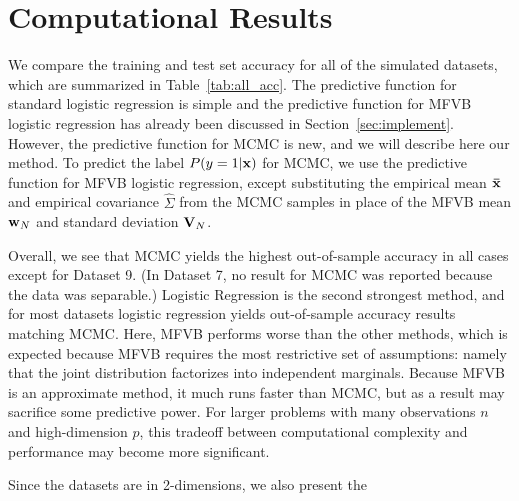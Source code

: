 
\section{Computational Results}\label{sec:comp}

We compare the training and test set accuracy for all of the simulated datasets, which are summarized in Table~\ref{tab:all_acc}.
The predictive function for standard logistic regression is simple and the predictive function for MFVB logistic regression has already been discussed in Section~\ref{sec:implement}.  However, the predictive function for MCMC is new, and we will describe here our method.  To predict the label $P(y=1|\boldsymbol{\mathbf{x}})$ for MCMC, we use the predictive function for MFVB logistic regression, except substituting the empirical mean $\boldsymbol{\mathbf{\bar x}}$ and empirical covariance ${\hat \Sigma}$ from the MCMC samples in place of the MFVB mean $\boldsymbol{\mathbf{w}}_N$ and standard deviation $\boldsymbol{\mathbf{V}}_N$.
 
Overall, we see that MCMC yields the highest out-of-sample accuracy in all cases except for Dataset 9.  (In Dataset 7, no result for
MCMC was reported because the data was separable.)  Logistic Regression is the second strongest method, and for most datasets logistic regression yields out-of-sample accuracy results matching MCMC.  Here, MFVB performs worse than the other methods, which is expected because MFVB requires the most restrictive set of assumptions: namely that the joint distribution factorizes into independent marginals.  Because MFVB is an approximate method, it much runs faster than MCMC, but as a result may sacrifice some predictive power.  For larger problems with many observations $n$ and high-dimension $p$, this tradeoff between computational complexity and performance may become more significant.  

Since the datasets are in 2-dimensions, we also present the 




